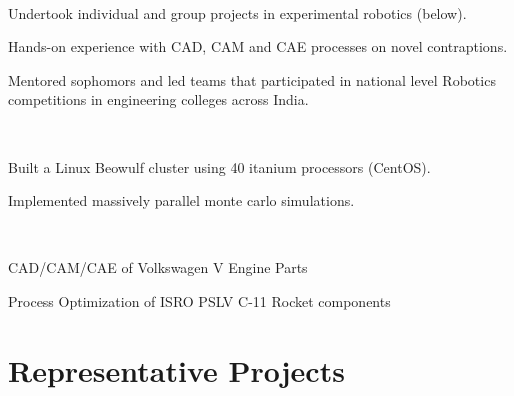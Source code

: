 \documentclass[]{deedy-resume-openfont}
\begin{document}
\begin{minipage}[t]{0.66\textwidth}
\\
\vspace{\topsep}
\begin{tightemize}
\item Undertook individual and group projects in experimental robotics (below).
\item Hands-on experience with CAD, CAM and CAE processes on novel contraptions.
\item Mentored sophomors and led teams that participated in national level Robotics competitions in engineering colleges across India.
\end{tightemize}
\sectionsep


\\
\vspace{\topsep}
\begin{tightemize}
\item Built a Linux Beowulf cluster using 40 itanium processors (CentOS).
\item Implemented massively parallel monte carlo simulations.
\end{tightemize}
\sectionsep


\\
\vspace{\topsep}
\begin{tightemize}\item CAD/CAM/CAE of Volkswagen V Engine Parts
\item Process Optimization of ISRO PSLV C-11 Rocket components
\end{tightemize}
\sectionsep



\newcommand\Topstrut{\rule{0pt}{2.1ex}}
\newcommand\Bottomstrut{\rule[-0.6ex]{0pt}{0pt}}

\section{Representative Projects}
\begin{tabular}{rll}


\end{tabular}
\end{minipage}
\end{document}
